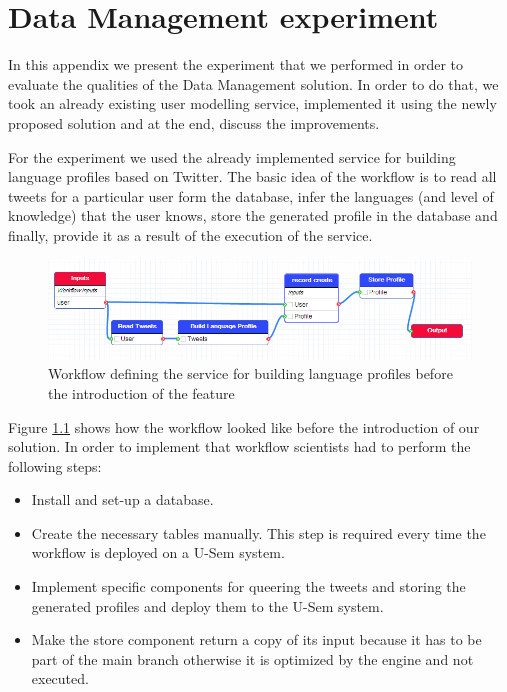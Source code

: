 \chapter{Data Management experiment} 
\label{cha:transf}

In this appendix we present the experiment that we performed in order to evaluate the qualities of the Data Management solution. In order to do that, we took an already existing user modelling service, implemented it using the newly proposed solution and at the end, discuss the improvements. 

For the experiment we used the already implemented service for building language profiles based on Twitter. The basic idea of the workflow is to read all tweets for a particular user form the database, infer the languages (and level of knowledge) that the user knows, store the generated profile in the database and finally, provide it as a result of the execution of the service.

\begin{figure}[h!]
  \centering
  	\includegraphics[scale=0.5]{storage/eval/before.png}
  \caption{Workflow defining the service for building language profiles before the introduction of the feature}
  \label{fig:storageEvalBefore}
\end{figure}

Figure \ref{fig:storageEvalBefore} shows how the workflow looked like before the introduction of our solution. In order to implement that workflow scientists had to perform the following steps:
\begin{itemize}
	\item Install and set-up a database.
	\item Create the necessary tables manually. This step is required every time the workflow is deployed on a U-Sem system. 
	\item Implement specific components for queering the tweets and storing the generated profiles and deploy them to the U-Sem system.
	\item Make the store component return a copy of its input because it has to be part of the main branch otherwise it is optimized by the engine and not executed.
\end{itemize}

